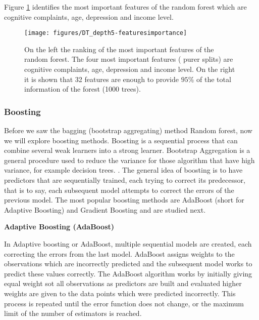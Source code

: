 \documentclass[11pt]{article}
\theoremstyle{definition}
\theoremstyle{remark}
\begin{document}
Figure \ref{fig:rf-features} identifies the most important features of the random forest which are cognitive complaints, age, depression and income level.
\begin{figure}[H]
        \centering
        \texttt{[image: figures/DT\_depth5-featuresimportance]}
        \caption{On the left the ranking of the most important features of the random forest. The four most important features ( purer splits) are cognitive complaints, age, depression and income level. On the right it is shown that 32 features are enough to provide $95\%$ of the total information of the forest (1000 trees).   
        } \label{fig:rf-features}
\end{figure}

\subsubsection{Boosting}
\label{se:resgradboosting}

Before we saw the bagging (bootstrap aggregating) method Random forest, now we will explore boosting methods.
Boosting is a sequential process that can combine several weak learners into a strong learner. Bootstrap Aggregation is a general procedure used to reduce the variance for those algorithm that have high variance, for example  decision trees. . The general idea of boosting is to have predictors that are sequentially trained, each trying to correct its predecessor, that is to say, each subsequent model attempts to correct the errors of the previous model.
The most popular boosting methods are AdaBoost (short for Adaptive Boosting) and Gradient Boosting and are studied next.

\textbf{Adaptive Boosting (AdaBoost)}

In Adaptive boosting or AdaBoost, multiple sequential models are created, each correcting the errors from the last model. AdaBoost assigns weights to the observations which are incorrectly predicted and the subsequent model works to predict these values correctly. The AdaBoost algorithm works by initially giving equal weight sot all observations as predictors are built and evaluated 
higher weights are given to the data points which were predicted incorrectly. This process is repeated until the error function does not change, or the maximum limit of the number of estimators is reached.
\end{document}
